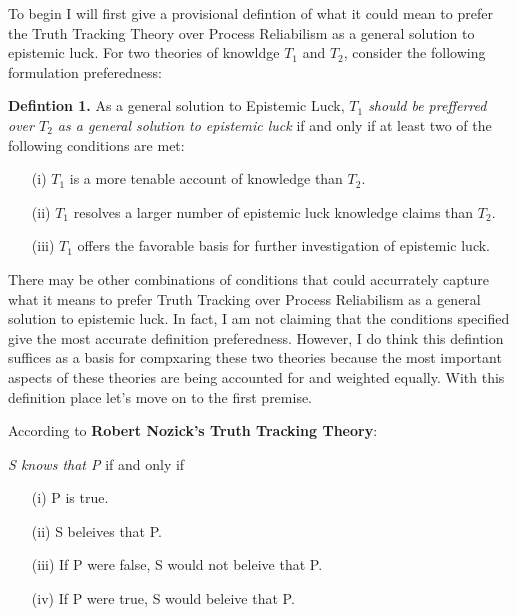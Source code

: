 \documentclass{article}
\begin{document}
To begin I will first give a provisional defintion of what it could mean to
prefer the Truth Tracking Theory over Process Reliabilism as a general solution to
epistemic luck. For two theories of knowldge $T_{1}$ and $T_{2}$, consider the
following formulation preferedness:
\begin{displayquote}
    \textbf{Defintion 1.} As a general solution to Epistemic Luck,
    \textit{$T_{1}$ should be prefferred over $T_{2}$ as a general solution
    to epistemic luck} if and only if at least two of the following conditions are met:
    \begin{enumerate}
        \item[(i)] $T_{1}$ is a more tenable account of knowledge than $T_{2}$.
        \item[(ii)] $T_{1}$ resolves a larger number of epistemic luck knowledge claims than $T_{2}$.
        \item[(iii)] $T_{1}$ offers the favorable basis for further investigation of epistemic luck.
    \end{enumerate}
\end{displayquote}
  There may be other combinations of conditions that could accurrately capture
what it means to prefer Truth Tracking over Process Reliabilism as a general
solution to epistemic luck. In fact, I am not claiming that the conditions
specified give the most accurate definition preferedness. However, I do think
this defintion suffices as a basis for compxaring these two theories because
the most important aspects of these theories are being accounted for and weighted
equally. With this definition place let's move on to the first premise.

According to \textbf{Robert Nozick's Truth Tracking Theory}:
\begin{displayquote}
  \textit{S knows that P} if and only if
  \begin{enumerate}
      \item[(i)] P is true.
      \item[(ii)] S beleives that P.
      \item[(iii)] If P were false, S would not beleive that P.
      \item[(iv)] If P were true, S would beleive that P.
  \end{enumerate}
\end{displayquote}
\end{document}
